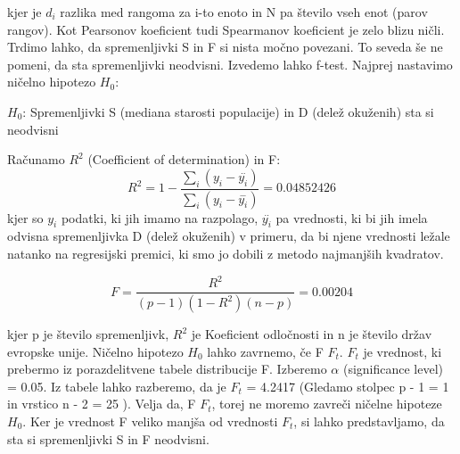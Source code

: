 \documentclass[a4paper,11pt]{article}
\begin{document}
kjer je \( d_i \) razlika med rangoma za i-to enoto in N pa število vseh enot (parov rangov).
Kot Pearsonov koeficient tudi Spearmanov koeficient je zelo blizu ničli. Trdimo lahko, da spremenljivki S in F si nista močno povezani. To seveda še ne pomeni, da sta spremenljivki neodvisni. Izvedemo lahko f-test. Najprej nastavimo ničelno hipotezo \( H_0 \):

\begin{center}
\( H_0 \): Spremenljivki S (mediana starosti populacije) in D (delež okuženih) sta si neodvisni
\end{center}
Računamo \( R^2 \) (Coefficient of determination) in F:
\[R^2 = 1 - \frac{\sum_{i}{}(y_i - \overset{..}{y_i})}{\sum_{i}{}(y_i - \overset{-}{y_i})} = 0.04852426\]
kjer so \(y_i\) podatki, ki jih imamo na razpolago, \(\overset{..}{y_i}\) pa vrednosti, ki bi jih imela odvisna spremenljivka D (delež okuženih) v primeru, da bi njene vrednosti ležale natanko na regresijski premici, ki smo jo dobili z metodo najmanjših kvadratov.

\[F = \frac{R^2}{(p - 1)(1 - R^2)(n - p)} = 0.00204 \]

kjer p je število spremenljivk, \( R^2 \) je Koeficient odločnosti in n je število držav evropske unije. Ničelno hipotezo \( H_0 \) lahko zavrnemo, če F \ge \(F_t \). \(F_t\) je vrednost, ki prebermo iz porazdelitvene tabele distribucije F. Izberemo \(\alpha\) (significance level) = 0.05. Iz tabele lahko razberemo, da je \( F_t \) = 4.2417 (Gledamo stolpec p - 1 = 1 in vrstico n - 2 = 25 ). Velja da, F \lt \(F_t\), torej ne moremo zavreči ničelne hipoteze \(H_0\). Ker je vrednost F veliko manjša od vrednosti \(F_t\), si lahko predstavljamo, da sta si spremenljivki S in F neodvisni.
\end{document}
